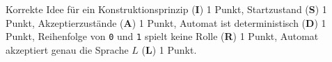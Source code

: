 \begin{bewertung}
Korrekte Idee für ein Konstruktionsprinzip ({\bf I}) 1 Punkt,
Startzustand ({\bf S}) 1 Punkt,
Akzeptierzustände ({\bf A}) 1 Punkt,
Automat ist deterministisch ({\bf D}) 1 Punkt,
Reihenfolge von \texttt{0} und \texttt{1} spielt keine Rolle ({\bf R}) 1 Punkt,
Automat akzeptiert genau die Sprache $L$ ({\bf L}) 1 Punkt.
\end{bewertung}
